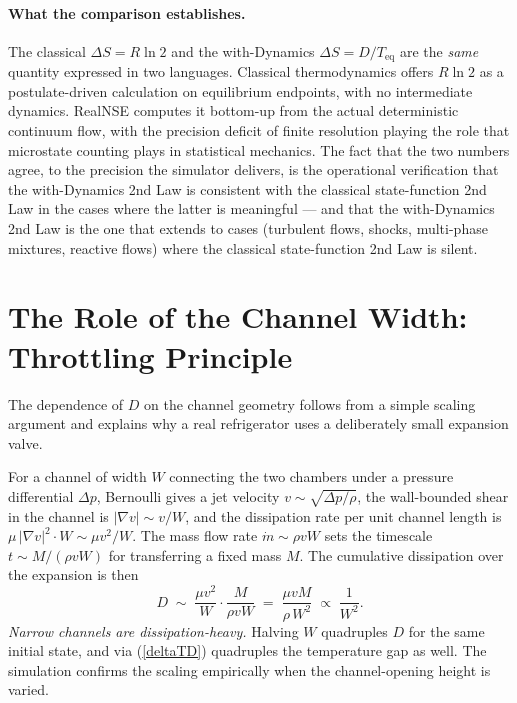 \paragraph{What the comparison establishes.}
The classical $\Delta S = R\ln 2$ and the with-Dynamics
$\Delta S = D / T_{\mathrm{eq}}$ are the \emph{same} quantity expressed
in two languages. Classical thermodynamics offers $R\ln 2$ as a
postulate-driven calculation on equilibrium endpoints, with no
intermediate dynamics. RealNSE computes it bottom-up from the actual
deterministic continuum flow, with the precision deficit of finite
resolution playing the role that microstate counting plays in
statistical mechanics. The fact that the two numbers agree, to the
precision the simulator delivers, is the operational verification that
the with-Dynamics 2nd Law is consistent with the classical
state-function 2nd Law in the cases where the latter is meaningful ---
and that the with-Dynamics 2nd Law is the one that extends to cases
(turbulent flows, shocks, multi-phase mixtures, reactive flows) where
the classical state-function 2nd Law is silent.

\section{The Role of the Channel Width: Throttling Principle}

The dependence of $D$ on the channel geometry follows from a simple scaling
argument and explains why a real refrigerator uses a deliberately small
expansion valve.

For a channel of width $W$ connecting the two chambers under a pressure
differential $\Delta p$, Bernoulli gives a jet velocity
$v\sim\sqrt{\Delta p/\rho}$, the wall-bounded shear in the channel is
$|\nabla v|\sim v/W$, and the dissipation rate per unit channel length is
$\mu\,|\nabla v|^2 \cdot W \sim \mu v^2 / W$. The mass flow rate
$\dot m\sim \rho v W$ sets the timescale $t \sim M/(\rho v W)$ for transferring
a fixed mass $M$. The cumulative dissipation over the expansion is then
\begin{equation}\label{Dscaling}
D \;\sim\; \frac{\mu v^2}{W}\cdot \frac{M}{\rho v W}
       \;=\; \frac{\mu v M}{\rho\,W^2}
       \;\propto\; \frac{1}{W^2} .
\end{equation}
\emph{Narrow channels are dissipation-heavy.} Halving $W$ quadruples $D$ for the
same initial state, and via (\ref{deltaTD}) quadruples the temperature gap as
well. The simulation confirms the scaling empirically when the channel-opening
height is varied.

